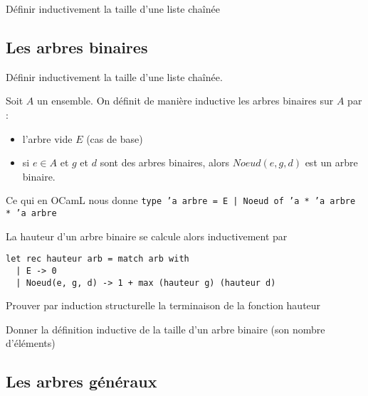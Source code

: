 \begin{exercise}
	Définir inductivement la taille d'une liste chaînée
\end{exercise}

\subsection{Les arbres binaires}

\begin{exercise}
	Définir inductivement la taille d'une liste chaînée.
\end{exercise}

\begin{definition}
	Soit $A$ un ensemble. On définit de manière inductive les arbres binaires sur $A$ par : \begin{itemize}
		\item l'arbre vide $E$ (cas de base)
		\item si $e\in A$ et $g$ et $d$ sont des arbres binaires, alors $Noeud(e,g,d)$ est un arbre binaire.
	\end{itemize}
\end{definition}

\begin{impl}
	Ce qui en OCamL nous donne \texttt{type 'a arbre = E | Noeud of 'a * 'a arbre * 'a arbre}
\end{impl}

\begin{example}
	La hauteur d'un arbre binaire se calcule alors inductivement par \begin{lstlisting}
let rec hauteur arb = match arb with
  | E -> 0
  | Noeud(e, g, d) -> 1 + max (hauteur g) (hauteur d)
	\end{lstlisting}
\end{example}

\begin{exercise}
	Prouver par induction structurelle la terminaison de la fonction hauteur
\end{exercise}

\begin{exercise}
	Donner la définition inductive de la taille d'un arbre binaire (son nombre d'éléments)
\end{exercise}

\subsection{Les arbres généraux}

